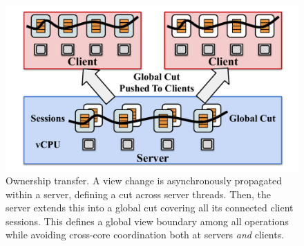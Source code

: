 \begin{figure}[t]
\centering
\includegraphics[width=\columnwidth]{figures/ownership-transfer.pdf}
\caption{Ownership transfer. A view change is asynchronously propagated
  within a server, defining a cut across server threads. Then, the server
  extends this into a global cut covering all its connected client sessions.
  This defines a global view boundary among all operations while
  avoiding cross-core coordination both at servers \emph{and} clients.}
\label{fig:ownership}
\end{figure}
